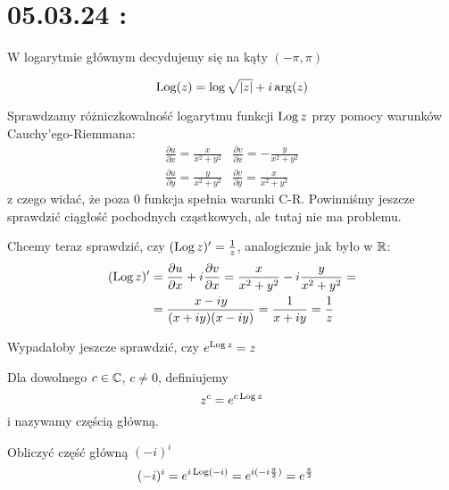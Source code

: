 \section{05.03.24 : }

W logarytmie głównym decydujemy się na kąty $(-\pi, \pi)$

\begin{center}
\end{center}

$$\operatorname{Log}(z)=\log\sqrt{|z|}+i\arg(z)$$

Sprawdzamy różniczkowalność logarytmu funkcji $\operatorname{Log} z$ przy pomocy warunków Cauchy'ego-Riemmana:
$$\begin{matrix}
  \frac{\partial u}{\partial x}=\frac{x}{x^2+y^2} & \frac{\partial v}{\partial x}=-\frac{y}{x^2+y^2}\\ 
  \frac{\partial u}{\partial y}=\frac{y}{x^2+y^2} & \frac{\partial v}{\partial y}=\frac{x}{x^2+y^2}
\end{matrix}$$
z czego widać, że poza $0$ funkcja spełnia warunki C-R. Powinniśmy jeszcze sprawdzić ciągłość pochodnych cząstkowych, ale tutaj nie ma problemu.

Chcemy teraz sprawdzić, czy $(\operatorname{Log} z)'=\frac{1}{z}$, analogicznie jak było w $\operatorname{\mathbb{R}}$:
\begin{align*}
  (\operatorname{Log} z)'&=\frac{\partial u}{\partial x}+i\frac{\partial v}{\partial x}=\frac{x}{x^2+y^2}-i\frac{y}{x^2+y^2}=\\ 
           &=\frac{x-iy}{(x+iy)(x-iy)}=\frac{1}{x+iy}=\frac{1}{z}
\end{align*}

Wypadałoby jeszcze sprawdzić, czy $e^{\operatorname{Log} z}=z$

\begin{definition}
  Dla dowolnego $c\in\operatorname{\mathbb{C}}$, $c\neq 0$, definiujemy 
  $$z^c=e^{c\operatorname{Log} z}$$
  i nazywamy częścią główną.
\end{definition}

\begin{example}
  \item Obliczyć część główną $(-i)^i$
    \begin{align*}
      (-i)^i&=e^{i\operatorname{Log}(-i)}=e^{i(-i\frac{\pi}{2})}=e^{\frac{\pi}{2}}
    \end{align*}
\end{example}

